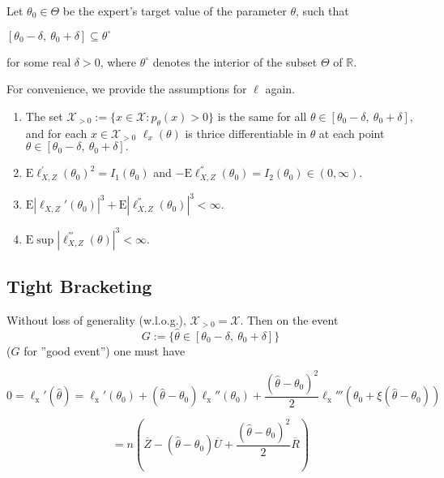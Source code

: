 Let $\theta_{0}\in \Theta$ be the expert's target value of the parameter $\theta$, such that
\begin{center}
	$[\theta_{0}-\delta,\ \theta_{0}+\delta]\subseteq \theta^{\circ}$ 
\end{center}
for some real $\delta>0$, where $\theta^{\circ}$ denotes the interior of the subset $\Theta$ of $\mathbb{R}$.

For convenience, we provide the assumptions for $\ell$ again.

\begin{enumerate}
	\item The set $\mathcal{X}_{>0} :=\{x\in \mathcal{X}:p_{\theta}(x)>0\}$ is the same for all $\theta\in [\theta_{0}-\delta,\ \theta_{0}+\delta],$ and for each $x\in \mathcal{X}_{>0}$ $\ell_{x}(\theta)$ is thrice differentiable in $\theta$ at each point $\theta\in [\theta_{0}-\delta,\ \theta_{0}+\delta].$
	\item $\mathrm{E}\ell_{X,Z}^{'}(\theta_{0})^{2}=I_1(\theta_0)$ and $-\mathrm{E}\ell_{X,Z}^{''}(\theta_{0})=I_2(\theta_{0})\in (0,\infty)$.
	\item $\mathrm{E}|\ell_{X,Z}'(\theta_{0})|^{3}+\mathrm{E}|\ell_{X,Z}^{''}(\theta_{0})|^{3}<\infty.$
	\item $\mathrm{E} \sup |\ell_{X,Z}^{'''}(\theta)|^{3}<\infty.$
\end{enumerate}

\medskip

\subsection*{Tight Bracketing}

Without loss of generality (w.l.o.g.), $\mathcal{X}_{>0}=\mathcal{X}$. Then on the event
\begin{equation}\label{eqn:goodevent}
	G:=\{\hat{\theta}\in[\theta_{0}-\delta,\ \theta_{0}+\delta]\}
\end{equation}
($G$ for ''good event'') one must have

\begin{equation}\label{eqn:taylor}
0 =\ell_{\mathrm{x}}'(\displaystyle \hat{\theta})=\ell_{\mathrm{x}}'(\theta_{0})+(\hat{\theta}-\theta_{0})\ell_{\mathrm{x}}''(\theta_{0})+\frac{(\hat{\theta}-\theta_{0})^{2}}{2}\ell_{\mathrm{x}}'''(\theta_{0}+\xi(\hat{\theta}-\theta_{0}))
\end{equation}

\begin{equation}\label{eqn:taylor2}
=n(\overline{Z}-(\hat{\theta}-\theta_{0})\overline{U}+\frac{(\hat{\theta}-\theta_{0})^{2}}{2}\overline{R})
\end{equation}

